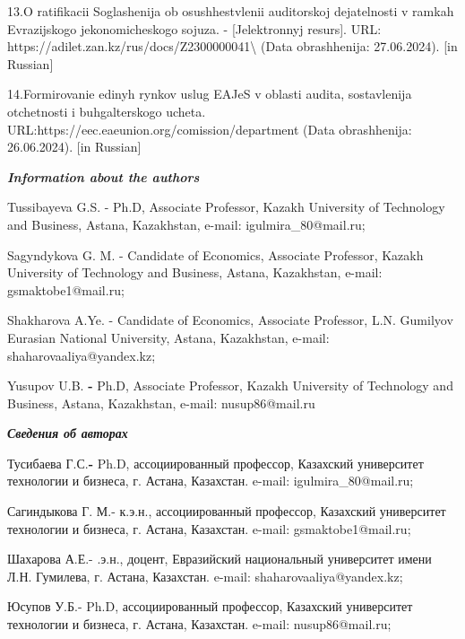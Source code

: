 13.O ratifikacii Soglashenija ob osushhestvlenii auditorskoj
dejatel\textquotesingle nosti v ramkah Evrazijskogo jekonomicheskogo
sojuza. - {[}Jelektronnyj resurs{]}. URL:
https://adilet.zan.kz/rus/docs/Z2300000041\textbackslash{} (Data
obrashhenija: 27.06.2024). {[}in Russian{]}

14.Formirovanie edinyh rynkov uslug EAJeS v oblasti audita, sostavlenija
otchetnosti i buhgalterskogo ucheta.
URL:https://eec.eaeunion.org/comission/department (Data obrashhenija:
26.06.2024). {[}in Russian{]}

\emph{\textbf{Information about the authors}}

Tussibayeva G.S. - Ph.D, Associate Professor, Kazakh University of
Technology and Business, Astana, Kazakhstan, e-mail:
igulmira\_80@mail.ru;

Sagyndykova G. M. - Candidate of Economics, Associate Professor, Kazakh
University of Technology and Business, Astana, Kazakhstan, e-mail:
gsmaktobe1@mail.ru;

Shakharova A.Ye. - Candidate of Economics, Associate Professor, L.N.
Gumilyov Eurasian National University, Astana, Kazakhstan, e-mail:
shaharovaaliya@yandex.kz;

Yusupov U.B. \textbf{-} Ph.D, Associate Professor, Kazakh University of
Technology and Business, Astana, Kazakhstan, e-mail: nusup86@mail.ru

\emph{\textbf{Сведения об авторах}}

Тусибаева Г.С.\textbf{-} Ph.D, ассоциированный профессор, Казахский
университет технологии и бизнеса, г. Астана, Казахстан. e-mail:
igulmira\_80@mail.ru;

Сагиндыкова Г. М.- к.э.н., ассоциированный профессор, Казахский
университет технологии и бизнеса, г. Астана, Казахстан. e-mail:
gsmaktobe1@mail.ru;

Шахарова А.Е.- .э.н., доцент, Евразийский национальный университет имени
Л.Н. Гумилева, г. Астана, Казахстан. e-mail: shaharovaaliya@yandex.kz;

Юсупов У.Б.- Ph.D, ассоциированный профессор, Казахский университет
технологии и бизнеса, г. Астана, Казахстан. e-mail: nusup86@mail.ru;
